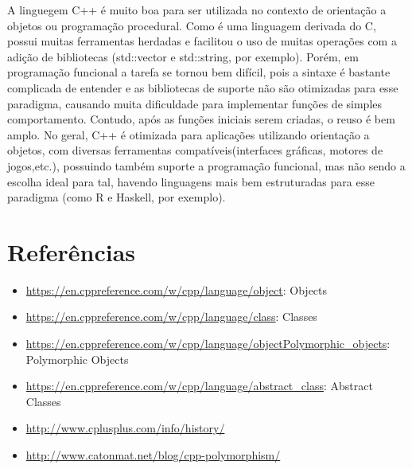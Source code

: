 \documentclass[rel_mlp]{iiufrgs}
\begin{document}
A linguegem C++ é muito boa para ser utilizada no contexto de orientação a objetos ou programação procedural. Como é uma linguagem derivada do C, possui muitas ferramentas herdadas e facilitou o uso de muitas operações com a adição de bibliotecas (std::vector e std::string, por exemplo). Porém, em programação funcional a tarefa se tornou bem difícil, pois a sintaxe é bastante complicada de entender e as bibliotecas de suporte não são otimizadas para esse paradigma, causando muita dificuldade para implementar funções de simples comportamento. Contudo, após as funções iniciais serem criadas, o reuso é bem amplo.
No geral, C++ é otimizada para aplicações utilizando orientação a objetos, com diversas ferramentas compatíveis(interfaces gráficas, motores de jogos,etc.), possuindo também suporte a programação funcional, mas não sendo a escolha ideal para tal, havendo linguagens mais bem estruturadas para esse paradigma (como R e Haskell, por exemplo).

\section{Referências}
\begin{itemize}[leftmargin=3em]
	
	\setlength{\itemindent}{1em}
	
	\item\url{https://en.cppreference.com/w/cpp/language/object}: Objects
	
	\item\url{https://en.cppreference.com/w/cpp/language/class}: Classes
	
	\item\url{https://en.cppreference.com/w/cpp/language/objectPolymorphic_objects}: Polymorphic Objects
	\item\url{https://en.cppreference.com/w/cpp/language/abstract_class}: Abstract Classes
	\item \url{http://www.cplusplus.com/info/history/}
	\item \url{http://www.catonmat.net/blog/cpp-polymorphism/}
	
	
\end{itemize}
\end{document}
